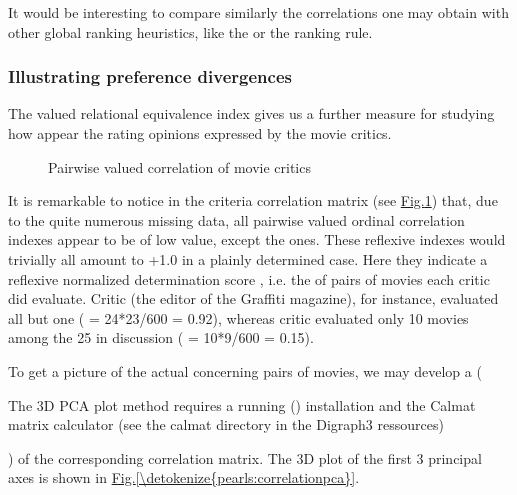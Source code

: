 \documentclass[a4paper,12pt,english]{sphinxhowto}
\let\sphinxpxdimen\pdfpxdimen\else\newdimen\sphinxpxdimen
\begin{document}
\sphinxAtStartPar
It would be interesting to compare similarly the correlations one may obtain with other global ranking heuristics, like the  or the  ranking rule.


\subsubsection{Illustrating preference divergences}
\label{\detokenize{pearls:illustrating-preference-divergences}}
\sphinxAtStartPar
The valued relational equivalence index gives us a further measure for studying how  appear the rating opinions expressed by the movie critics.

\begin{figure}[H]
\centering
\capstart

\noindent\sphinxincludegraphics[width=600\sphinxpxdimen]{{correlationTable}.png}
\caption{Pairwise valued correlation of movie critics}\label{\detokenize{pearls:correlationtable}}\end{figure}

\sphinxAtStartPar
It is remarkable to notice in the criteria correlation matrix (see \hyperref[\detokenize{pearls:correlationtable}]{Fig.\@ \ref{\detokenize{pearls:correlationtable}}}) that, due to the quite numerous missing data, all pairwise valued ordinal correlation indexes  appear to be of low value, except the  ones. These reflexive indexes  would trivially all amount to +1.0 in a plainly determined case. Here they indicate a reflexive normalized determination score , i.e. the  of pairs of movies each critic did evaluate. Critic  (the editor of the Graffiti magazine), for instance, evaluated all but one ( = 24*23/600 = 0.92), whereas critic  evaluated only 10 movies among the 25 in discussion ( = 10*9/600 = 0.15).

\sphinxAtStartPar
To get a picture of the actual  concerning  pairs of movies, we may develop a  (%
\begin{footnote}[2]\sphinxAtStartFootnote
The 3D PCA plot method requires a running   () installation and the Calmat matrix calculator (see the calmat directory in the Digraph3 ressources)
%
\end{footnote}) of the corresponding  correlation matrix. The 3D plot of the first 3 principal axes is shown in \hyperref[\detokenize{pearls:correlationpca}]{Fig.\@ \ref{\detokenize{pearls:correlationpca}}}.
\end{document}

